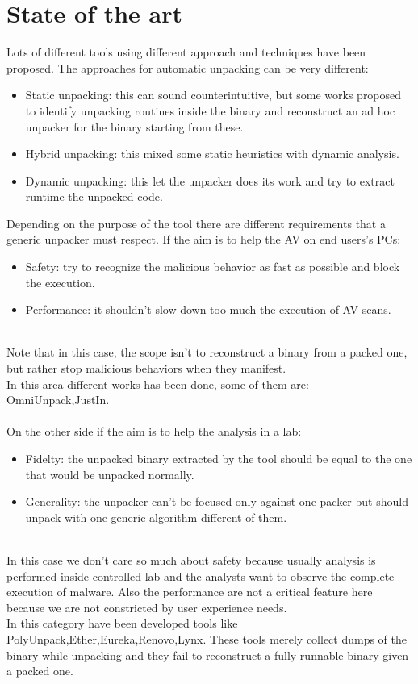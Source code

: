 \section{State of the art}
Lots of different tools using different approach and techniques have been proposed. 
The approaches for automatic unpacking can be very different:
\begin{itemize}
\item Static unpacking: this can sound counterintuitive, but some works proposed to identify unpacking routines inside the binary and reconstruct an ad hoc unpacker for the binary starting from these.
\item Hybrid unpacking: this mixed some static heuristics with dynamic analysis.
\item Dynamic unpacking: this let the unpacker does its work and try to extract runtime the unpacked code. 
\end{itemize}
Depending on the purpose of the tool there are different requirements that a generic unpacker must respect. If the aim is to help the AV on end users's PCs:
\begin{itemize}
\item Safety: try to recognize the malicious behavior as fast as possible and block the execution. 
\item Performance: it shouldn't slow down too much the execution of AV scans.
\end{itemize}
\\
Note that in this case, the scope isn't to reconstruct a binary from a packed one, but rather stop malicious behaviors when they manifest. \\
In this area different works has been done, some of them are: OmniUnpack,JustIn. 
\\\\
On the other side if the aim is to help the analysis in a lab:

\begin{itemize}
\item Fidelty: the unpacked binary extracted by the tool should be equal to the one that would be unpacked normally. 
\item Generality: the unpacker can't be focused only against one packer but should unpack with one generic algorithm different of them.
\end{itemize}
\\
In this case we don't care so much about safety because usually analysis is performed inside controlled lab and the analysts want to observe the complete execution of malware. Also the performance are not a critical feature here because we are not constricted by user experience needs.
\\
In this category have been developed tools like PolyUnpack,Ether,Eureka,Renovo,Lynx.
These tools merely collect dumps of the binary while unpacking and they fail to reconstruct a fully runnable binary given a packed one.


